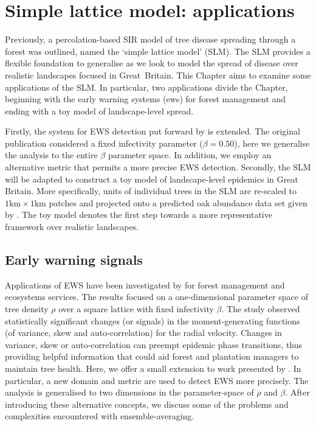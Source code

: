 
\chapter{Simple lattice model: applications}
\label{chapter:SLM-applications}

Previously, a percolation-based SIR model of tree disease spreading through a forest was outlined, named the `simple lattice model' (SLM).
The SLM provides a flexible foundation to generalise as we look to model the spread of disease over realistic landscapes focused in Great Britain.
This Chapter aims to examine some applications of the SLM.
In particular, two applications divide the Chapter, beginning with the early warning systems (\acrshort{ews}) for forest management and ending with a toy model of landscape-level spread.

Firstly, the system for EWS detection put forward by \cite{OROZCOFUENTES201912} is extended. 
The original publication considered a fixed infectivity parameter ($\beta = 0.50$), here we generalise the analysis to the entire $\beta$ parameter space. 
In addition, we employ an alternative metric that permits a more precise EWS detection.
Secondly, the SLM will be adapted to construct a toy model of landscape-level epidemics in Great Britain.
More specifically, units of individual trees in the SLM are re-scaled to $\mathrm{1km \times 1km}$ patches 
and projected onto a predicted oak abundance data set given by \cite{hill.data}.
The toy model denotes the first step towards a more representative framework over realistic landscapes.

\section{Early warning signals}
\label{sec:EWS}

Applications of EWS have been investigated by \cite{OROZCOFUENTES201912} for forest management and ecosystems services.
The results focused on a one-dimensional parameter space of tree density $\rho$ over a square lattice with fixed infectivity $\beta$.
The study observed statistically significant changes (or signals) in the
moment-generating functions (of variance, skew and auto-correlation) for the radial velocity.
Changes in variance, skew or auto-correlation can preempt epidemic phase transitions, 
thus providing helpful information that could aid forest and plantation managers to maintain tree health. 
Here, we offer a small extension to work presented by \cite{OROZCOFUENTES201912}.
In particular, a new domain and metric are used to detect EWS more precisely.  
The analysis is generalised to two dimensions in the parameter-space of $\rho$ and $\beta$. 
After introducing these alternative concepts, we discuss some of the problems and complexities encountered with ensemble-averaging. 

